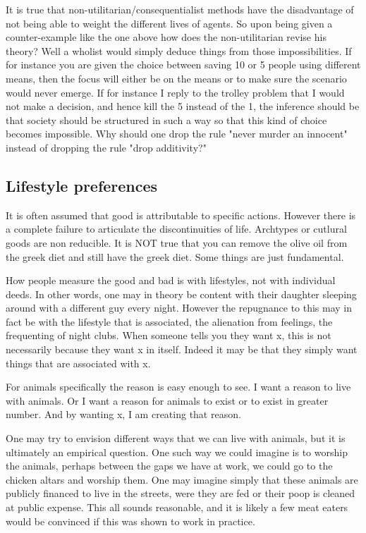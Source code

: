 It is true that non-utilitarian/consequentialist methods have the disadvantage of not being able to weight the different lives of agents. So upon being given a counter-example like the one above how does the non-utilitarian revise his theory? Well a wholist would simply deduce things from those impossibilities. If for instance you are given the choice between saving 10 or 5 people using different means, then the focus will either be on the means or to make sure the scenario would never emerge. If for instance I reply to the trolley problem that I would not make a decision, and hence kill the 5 instead of the 1, the inference should be that society should be structured in such a way so that this kind of choice becomes impossible. Why should one drop the rule "never murder an innocent" instead of dropping the rule "drop additivity?" 


\subsection{Lifestyle preferences}

It is often assumed that good is attributable to specific actions. However there is a complete failure to articulate the discontinuities of life. Archtypes or cutlural goods are non reducible. It is NOT true that you can remove the olive oil from the greek diet and still have the greek diet. Some things are just fundamental. 

How people measure the good and bad is with lifestyles, not with individual deeds. In other words, one may in theory be content with their daughter sleeping around with a different guy every night. However the repugnance to this may in fact be with the lifestyle that is associated, the alienation from feelings, the frequenting of night clubs. When someone tells you they want 
 x, this is not necessarily because they want x in itself. Indeed it may be that they simply want things that are associated with x. 

For animals specifically the reason is easy enough to see. I want a reason to live with animals. Or I want a reason for animals to exist or to exist in greater number. And by wanting x, I am creating that reason. 

One may try to envision different ways that we can live with animals, but it is ultimately an empirical question. One such way we could imagine is to worship the animals, perhaps between the gaps we have at work, we could go to the chicken altars and worship them. One may imagine simply that these animals are publicly financed to live in the streets, were they are fed or their poop is cleaned at public expense. This all sounds reasonable, and it is likely a few meat eaters would be convinced if this was shown to work in practice.

